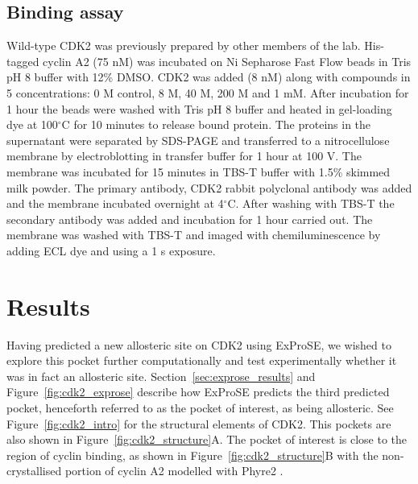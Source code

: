\subsection{Binding assay}

Wild-type CDK2 was previously prepared by other members of the lab.
His-tagged cyclin A2 (75 nM) was incubated on Ni Sepharose Fast Flow beads in Tris pH 8 buffer with 12\% DMSO.
CDK2 was added (8 nM) along with compounds in 5 concentrations: 0 M control, 8 \textmu M, 40 \textmu M, 200 \textmu M and 1 mM.
After incubation for 1 hour the beads were washed with Tris pH 8 buffer and heated in gel-loading dye at 100$^{\circ}$C for 10 minutes to release bound protein.
The proteins in the supernatant were separated by SDS-PAGE and transferred to a nitrocellulose membrane by electroblotting in transfer buffer for 1 hour at 100 V.
The membrane was incubated for 15 minutes in TBS-T buffer with 1.5\% skimmed milk powder.
The primary antibody, CDK2 rabbit polyclonal antibody was added and the membrane incubated overnight at 4$^{\circ}$C.
After washing with TBS-T the secondary antibody was added and incubation for 1 hour carried out.
The membrane was washed with TBS-T and imaged with chemiluminescence by adding ECL dye and using a 1 s exposure.


\section{Results}
\label{sec:cdk2_results}

Having predicted a new allosteric site on CDK2 using ExProSE, we wished to explore this pocket further computationally and test experimentally whether it was in fact an allosteric site.
Section~\ref{sec:exprose_results} and Figure~\ref{fig:cdk2_exprose} describe how ExProSE predicts the third predicted pocket, henceforth referred to as the pocket of interest, as being allosteric.
See Figure~\ref{fig:cdk2_intro} for the structural elements of CDK2.
This pockets are also shown in Figure~\ref{fig:cdk2_structure}A.
The pocket of interest is close to the region of cyclin binding, as shown in Figure~\ref{fig:cdk2_structure}B with the non-crystallised portion of cyclin A2 modelled with Phyre2 \cite{Kelley2015}.

